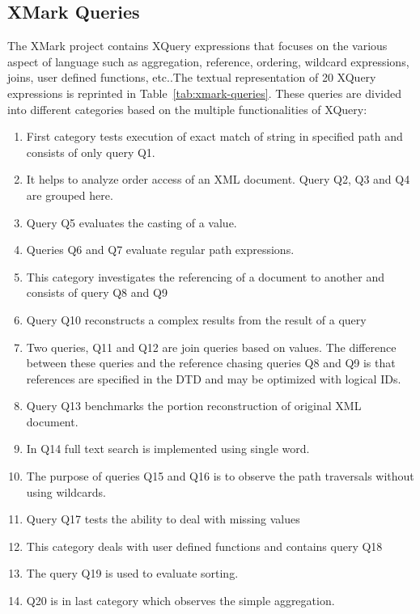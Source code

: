 \subsection{XMark Queries}\label{xmark-queries}
The XMark project contains XQuery expressions that focuses on the various aspect of language such as aggregation, reference, ordering, wildcard expressions, joins, user defined functions, etc.\citep{xmark/mlynkova2008xml}.The textual representation of 20  XQuery expressions is reprinted in  Table~\ref{tab:xmark-queries}. These queries are divided into different categories  based on the  multiple functionalities of XQuery: 
\begin{enumerate}[label=\arabic*.]
\item  First category tests execution of exact match of string in specified path and consists of only query Q1.
\item It helps to analyze order access of an XML document. Query Q2, Q3 and Q4 are grouped here.
\item Query Q5 evaluates the casting of a value.
\item Queries Q6 and Q7  evaluate regular path expressions.

\item This category investigates the referencing of a document to another and consists of query Q8 and Q9

\item Query Q10 reconstructs a complex results from the result of a query

\item Two queries, Q11 and Q12 are join queries based on values.  The difference between these queries and the reference chasing queries Q8 and Q9 is that references are specified in the DTD and may be optimized with logical IDs.

\item Query Q13  benchmarks the portion reconstruction of original XML document.
\item In Q14 full text search is implemented using single word.

\item The purpose of queries Q15 and Q16 is to observe the path traversals without using wildcards.

\item Query Q17 tests the ability to deal with missing values

\item This category deals with user defined functions and contains query Q18

\item The query Q19 is used to evaluate sorting.

\item Q20 is in last category which observes the  simple aggregation.

\end{enumerate}

